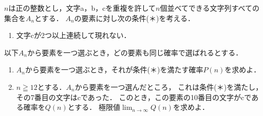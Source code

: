 \documentclass[../../main.tex]{subfiles}
\begin{document}
$n$は正の整数とし，文字a，b，cを重複を許して$n$個並べてできる文字列すべての集合を$A_n$とする．
$A_n$の要素に対し次の条件(＊)を考える．
\begin{enumerate}
  \item[(＊)]文字cが2つ以上連続して現れない．
\end{enumerate}
以下$A_n$から要素を一つ選ぶとき，どの要素も同じ確率で選ばれるとする．
\begin{enumerate}
  \item$A_n$から要素を一つ選ぶとき，それが条件(＊)を満たす確率$P(n)$を求めよ．
  \item$n\geqq12$とする．$A_n$から要素を一つ選んだところ，
    これは条件(＊)を満たし，その7番目の文字はcであった．
    このとき，この要素の10番目の文字がcである確率を$Q(n)$とする．
    極限値$\displaystyle\lim_{n\to\infty}Q(n)$を求めよ．
\end{enumerate}
\end{document}
